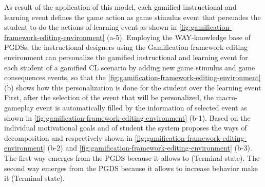 As result of the application of this model, each gamified instructional and learning event defines the game action  as game stimulus event that persuades the student  to do the actions of learning event as shown in \autoref{fig:gamification-framework-editing-environment} (a-5).
Employing the WAY-knowledge base of PGDSs, the instructional designers using the Gamification framework editing environment can personalize the gamified instructional and learning event for each student of a gamified CL scenario by adding new game stimulus and game consequences events, so that the \autoref{fig:gamification-framework-editing-environment} (b) shows how this personalization is done for the student  over the learning event 
First, after the selection of the event that will be personalized, the macro-gameplay event is automatically filled by the information of selected event as shown in \autoref{fig:gamification-framework-editing-environment} (b-1).
Based on the individual motivational goals  and  of student  the system proposes the ways of decomposition  and  respectively shown in \autoref{fig:gamification-framework-editing-environment} (b-2) and \autoref{fig:gamification-framework-editing-environment} (b-3).
The first way  emerges from the PGDS  because it allows to  (Terminal state).
The second way  emerges from the PGDS  because it allows to increase behavior make it  (Terminal state).

